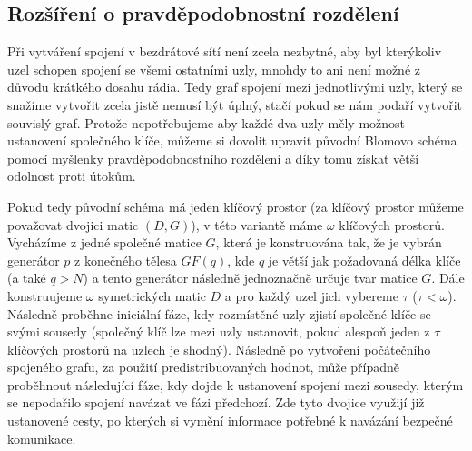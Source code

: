 \documentclass[11pt,final,twoside]{fithesis2}
\begin{document}
\subsection{Rozšíření o pravděpodobnostní rozdělení}
Při vytváření spojení v bezdrátové sítí není zcela nezbytné, aby byl kterýkoliv uzel schopen spojení se všemi ostatními uzly, mnohdy to ani není možné z důvodu krátkého dosahu rádia. Tedy
graf spojení mezi jednotlivými uzly, který se snažíme vytvořit zcela jistě nemusí být úplný, stačí pokud se nám podaří vytvořit souvislý graf. Protože nepotřebujeme aby každé dva uzly 
měly možnost ustanovení společného klíče, můžeme si dovolit upravit původní Blomovo schéma pomocí myšlenky pravděpodobnostního rozdělení a díky tomu získat větší odolnost proti útokům. 

Pokud tedy původní schéma má jeden klíčový prostor (za klíčový prostor můžeme považovat dvojici matic $(D, G)$), v této variantě máme $\omega$ klíčových prostorů. Vycházíme z jedné společné matice $G$, 
která je konstruována tak, že je vybrán generátor $p$ z konečného tělesa $GF(q)$, kde $q$ je větší jak požadovaná délka klíče (a také $q > N$) a tento generátor následně jednoznačně určuje tvar matice $G$.
Dále konstruujeme $\omega$ symetrických matic $D$ a pro každý uzel jich vybereme $\tau$ ($\tau < \omega$). Následně proběhne iniciální fáze, kdy rozmístěné uzly zjistí společné klíče se svými sousedy
(společný klíč lze mezi uzly ustanovit, pokud alespoň jeden z $\tau$ klíčových prostorů na uzlech je shodný). Následně po vytvoření počátečního spojeného grafu, za použití predistribuovaných hodnot, 
může případně proběhnout následující fáze, kdy dojde k ustanovení spojení mezi sousedy, kterým se nepodařilo spojení navázat ve fázi předchozí. Zde tyto dvojice využijí již ustanovené cesty, po kterých si 
vymění informace potřebné k navázání bezpečné komunikace. 
\end{document}
